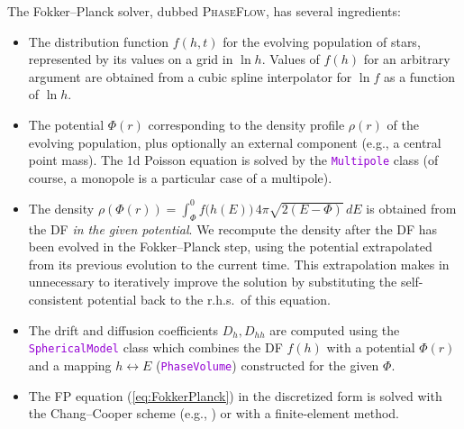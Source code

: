 \documentclass[12pt]{article}
\newcommand{\ttt}[1]{\textcolor{darkviolet}{\texttt{#1}}}
\begin{document}
The Fokker--Planck solver, dubbed \textsc{PhaseFlow}, has several ingredients:
\begin{itemize}
\item The distribution function $f(h,t)$ for the evolving population of stars, represented by its values on a grid in $\ln h$. Values of $f(h)$ for an arbitrary argument are obtained from a cubic spline interpolator for $\ln f$ as a function of $\ln h$.
\item The potential $\Phi(r)$ corresponding to the density profile $\rho(r)$ of the evolving population, plus optionally an external component (e.g., a central point mass). The 1d Poisson equation is solved by the \ttt{Multipole} class (of course, a monopole is a particular case of a multipole).
\item The density $\rho(\Phi(r)) = \int_{\Phi}^0 f\big(h(E)\big)\,4\pi\sqrt{2(E-\Phi)}\,dE$ is obtained from the DF \textit{in the given potential}. We recompute the density after the DF has been evolved in the Fokker--Planck step, using the potential extrapolated from its previous evolution to the current time. This extrapolation makes in unnecessary to iteratively improve the solution by substituting the self-consistent potential back to the r.h.s.\ of this equation.
\item The drift and diffusion coefficients $D_h, D_{hh}$ are computed using the \ttt{SphericalModel} class which combines the DF $f(h)$ with a potential $\Phi(r)$ and a mapping $h\leftrightarrow E$ (\ttt{PhaseVolume}) constructed for the given $\Phi$.
\item The FP equation (\ref{eq:FokkerPlanck}) in the discretized form is solved with the Chang--Cooper scheme (e.g., \cite{ParkPetrosian1996}) or with a finite-element method.
\end{itemize}

\newpage
{}
\end{document}
